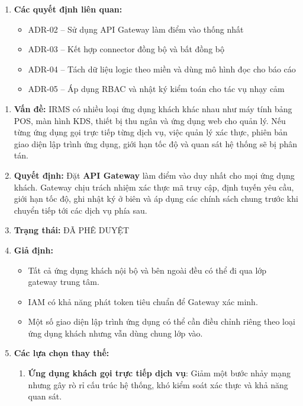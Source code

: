\documentclass[11pt,a4paper]{article}
\begin{document}
\begin{adrbox}[title={ADR-01: Lựa Chọn Kiến Trúc Lai Cho IRMS}]
\begin{enumerate}[leftmargin=1.9em,label=\arabic*.]
  \item \textbf{Các quyết định liên quan:}
  \begin{itemize}[leftmargin=1.8em]
    \item ADR-02 -- Sử dụng API Gateway làm điểm vào thống nhất
    \item ADR-03 -- Kết hợp connector đồng bộ và bất đồng bộ
    \item ADR-04 -- Tách dữ liệu logic theo miền và dùng mô hình đọc cho báo cáo
    \item ADR-05 -- Áp dụng RBAC và nhật ký kiểm toán cho tác vụ nhạy cảm
  \end{itemize}
\end{enumerate}
\end{adrbox}

\begin{adrbox}[title={ADR-02: Sử Dụng API Gateway Làm Điểm Vào Thống Nhất}]
\begin{enumerate}[leftmargin=1.9em,label=\arabic*.]
  \item \textbf{Vấn đề:} IRMS có nhiều loại ứng dụng khách khác nhau như máy tính bảng POS, màn hình KDS, thiết bị thu ngân và ứng dụng web cho quản lý. Nếu từng ứng dụng gọi trực tiếp từng dịch vụ, việc quản lý xác thực, phiên bản giao diện lập trình ứng dụng, giới hạn tốc độ và quan sát hệ thống sẽ bị phân tán.
  \item \textbf{Quyết định:} Đặt \textbf{API Gateway} làm điểm vào duy nhất cho mọi ứng dụng khách. Gateway chịu trách nhiệm xác thực mã truy cập, định tuyến yêu cầu, giới hạn tốc độ, ghi nhật ký ở biên và áp dụng các chính sách chung trước khi chuyển tiếp tới các dịch vụ phía sau.
  \item \textbf{Trạng thái:} ĐÃ PHÊ DUYỆT
  \item \textbf{Giả định:}
  \begin{itemize}[leftmargin=1.8em]
    \item Tất cả ứng dụng khách nội bộ và bên ngoài đều có thể đi qua lớp gateway trung tâm.
    \item IAM có khả năng phát token tiêu chuẩn để Gateway xác minh.
    \item Một số giao diện lập trình ứng dụng có thể cần điều chỉnh riêng theo loại ứng dụng khách nhưng vẫn dùng chung lớp vào.
  \end{itemize}
  \item \textbf{Các lựa chọn thay thế:}
  \begin{enumerate}[label=(\alph*),leftmargin=2.1em]
    \item \textbf{Ứng dụng khách gọi trực tiếp dịch vụ}: Giảm một bước nhảy mạng nhưng gây rò rỉ cấu trúc hệ thống, khó kiểm soát xác thực và khả năng quan sát.

\end{enumerate}
\end{enumerate}
\end{adrbox}
\end{document}
